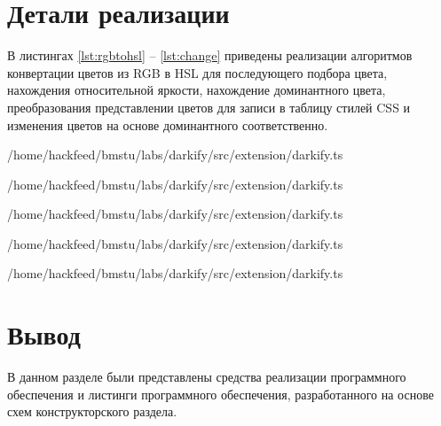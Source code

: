 \section{Детали реализации}

В листингах \ref{lst:rgbtohsl} -- \ref{lst:change} приведены реализации алгоритмов конвертации цветов из RGB в HSL для последующего подбора цвета, нахождения относительной яркости, нахождение доминантного цвета, преобразования представлении цветов для записи в таблицу стилей CSS и изменения цветов на основе доминантного соответственно. 

\begin{lstinputlisting}[
	caption={Реализация алгоритма конвертации цвета из RGB в HSL},
	label={lst:rgbtohsl},
	style={ES6},
	linerange={38-79},
	]{/home/hackfeed/bmstu/labs/darkify/src/extension/darkify.ts}
\end{lstinputlisting}

\begin{lstinputlisting}[
	caption={Реализация алгоритма нахождения относительной яркости},
	label={lst:luminance},
	style={ES6},
	linerange={80-91},
	]{/home/hackfeed/bmstu/labs/darkify/src/extension/darkify.ts}
\end{lstinputlisting}

\begin{lstinputlisting}[
	caption={Реализация алгоритма нахождения доминантного цвета},
	label={lst:domcolor},
	style={ES6},
	linerange={100-127},
	]{/home/hackfeed/bmstu/labs/darkify/src/extension/darkify.ts}
\end{lstinputlisting}

\begin{lstinputlisting}[
	caption={Реализация алгоритмов нахождения преобразования представлений цветов},
	label={lst:translate},
	style={ES6},
	linerange={16-37},
	]{/home/hackfeed/bmstu/labs/darkify/src/extension/darkify.ts}
\end{lstinputlisting}

\begin{lstinputlisting}[
	caption={Реализация алгоритма подбора цветов на основе базовго},
	label={lst:change},
	style={ES6},
	linerange={128-173},
	]{/home/hackfeed/bmstu/labs/darkify/src/extension/darkify.ts}
\end{lstinputlisting}

\section*{Вывод}

В данном разделе были представлены средства реализации программного обеспечения и листинги программного обеспечения, разработанного на основе схем конструкторского раздела.
